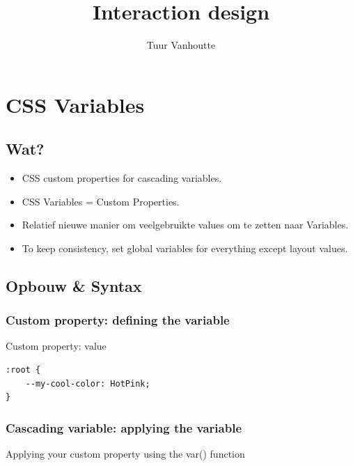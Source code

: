 \documentclass{article}
\begin{document}
\begin{titlepage}
    \author{Tuur Vanhoutte}
    \title{Interaction design}
\end{titlepage}

\maketitle
\newpage
\tableofcontents
\newpage


\section{CSS Variables}

\subsection{Wat?}

\begin{itemize}
    \item CSS custom properties for cascading variables.
    \item CSS Variables = Custom Properties.
    \item Relatief nieuwe manier om veelgebruikte values om te zetten naar Variables.
    \item To keep consistency, set global variables for everything except layout values.
\end{itemize}

\subsection{Opbouw \& Syntax}

\subsubsection{Custom property: defining the variable}
Custom property: value

\begin{verbatim}
:root {
    --my-cool-color: HotPink;
}
\end{verbatim}

\subsubsection{Cascading variable: applying the variable}

Applying your custom property using the var() function
\end{document}
